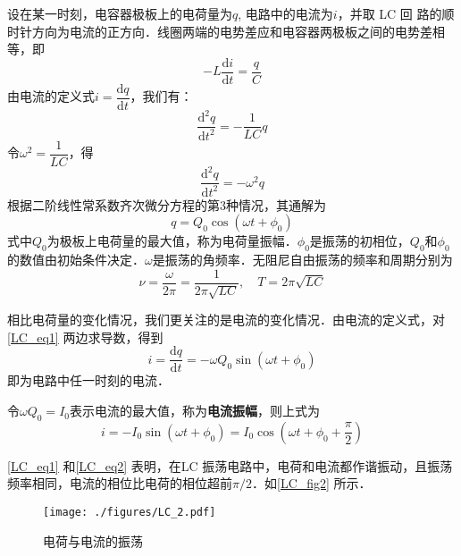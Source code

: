 设在某一时刻，电容器极板上的电荷量为$q$, 电路中的电流为$i$，并取 LC 回
路的顺时针方向为电流的正方向．线圈两端的电势差应和电容器两极板之间的电势差相等，即
\begin{equation}
-L \frac{\mathrm{d} i}{\mathrm{d} t}=\frac{q}{C}
\end{equation}
由电流的定义式$i=\dfrac{\mathrm{d} q}{\mathrm{d} t}$，我们有：
\begin{equation}
\frac{\mathrm{d}^{2} q}{\mathrm{d} t^{2}}=-\frac{1}{L C} q
\end{equation}
令$\omega^{2}=\dfrac{1}{L C}$，得
\begin{equation}
\frac{\mathrm{d}^{2} q}{\mathrm{d} t^{2}}=-\omega^{2} q
\end{equation}
根据二阶线性常系数齐次微分方程的第3种情况，其通解为
\begin{equation} \label{LC_eq1}
q=Q_{0} \cos \left(\omega t+\phi_{0}\right)
\end{equation}
式中$Q_0$为极板上电荷量的最大值，称为电荷量振幅．$\phi_0$是振荡的初相位，$Q_0$和$\phi_0$的数值由初始条件决定．$\omega$是振荡的角频率．无阻尼自由振荡的频率和周期分别为
\begin{equation}
\nu=\frac{\omega}{2 \pi}=\frac{1}{2 \pi \sqrt{L C}}, \quad T=2 \pi \sqrt{L C}
\end{equation}

相比电荷量的变化情况，我们更关注的是电流的变化情况．由电流的定义式，对\autoref{LC_eq1} 两边求导数，得到
\begin{equation}
i=\frac{\mathrm{d} q}{\mathrm{d} t}=-\omega Q_{0} \sin \left(\omega t+\phi_{0}\right)
\end{equation}
即为电路中任一时刻的电流．

令$\omega Q_0=I_0$表示电流的最大值，称为\textbf{电流振幅}，则上式为
\begin{equation} \label{LC_eq2}
i=-I_{0} \sin \left(\omega t+\phi_{0}\right)=I_{0} \cos \left(\omega t+\phi_{0}+\frac{\pi}{2}\right)
\end{equation}

\autoref{LC_eq1} 和\autoref{LC_eq2} 表明，在LC 振荡电路中，电荷和电流都作谐振动，且振荡频率相同，电流的相位比电荷的相位超前$\pi/2$．如\autoref{LC_fig2} 所示．

\begin{figure}[ht]
\centering
\texttt{[image: ./figures/LC\_2.pdf]}
\caption{电荷与电流的振荡} \label{LC_fig2}
\end{figure}

